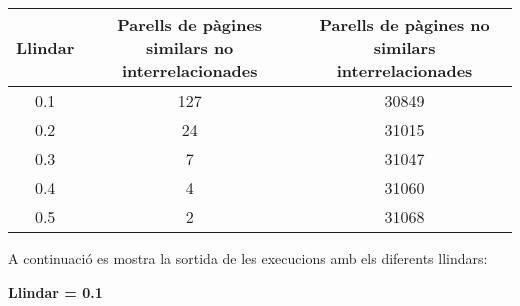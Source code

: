 \documentclass{report}
\begin{document}
\begin{center}
    \begin{tabular}{| c | c | c |}
    \hline
    Llindar & Parells de pàgines similars no interrelacionades & Parells de pàgines no similars interrelacionades \\ \hline 
    0.1 & 127 & 30849 \\ \hline
    0.2 & 24  & 31015 \\ \hline
    0.3 & 7   & 31047 \\ \hline
    0.4 & 4   & 31060 \\ \hline
    0.5 & 2   & 31068 \\
    \hline
    \end{tabular}
\end{center}

A continuació es mostra la sortida de les execucions amb els diferents llindars:
\newline
\newline
\centerline{ \textbf{Llindar = 0.1} }
\end{document}
